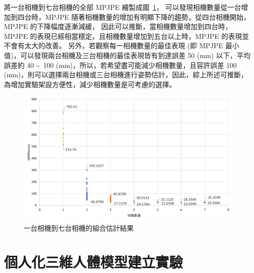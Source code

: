 將一台相機到七台相機的全部 MPJPE 繪製成圖~\ref{ch3_fig_1to7cam}，
可以發現相機數量從一台增加到四台時，MPJPE 隨著相機數量的增加有明顯下降的趨勢，從四台相機開始，MPJPE 的下降幅度逐漸減緩，
因此可以推斷，當相機數量增加到四台時，MPJPE 的表現已經相當穩定，且相機數量增加到五台以上時，MPJPE 的表現並不會有太大的改善。
另外，若觀察每一相機數量的最佳表現 (即 MPJPE 最小值)，可以發現兩台相機及三台相機的最佳表現皆有到達誤差 50 (mm) 以下，平均誤差約 40 \textasciitilde\ 100 (mm)，所以，若希望盡可能減少相機數量，且容許誤差 100 (mm)，則可以選擇兩台相機或三台相機進行姿勢估計，因此，綜上所述可推斷，為增加實驗架設方便性，減少相機數量是可考慮的選擇。
\begin{figure}[!ht]
   \centering
   \includegraphics[width=13cm]{figure/ch3_fig_1to7cam.png}
   \caption[一台相機到七台相機的組合估計結果]{一台相機到七台相機的組合估計結果}
   \label{ch3_fig_1to7cam}
\end{figure}

\clearpage

\section{個人化三維人體模型建立實驗}\label{ch4_skeleton_exp}


